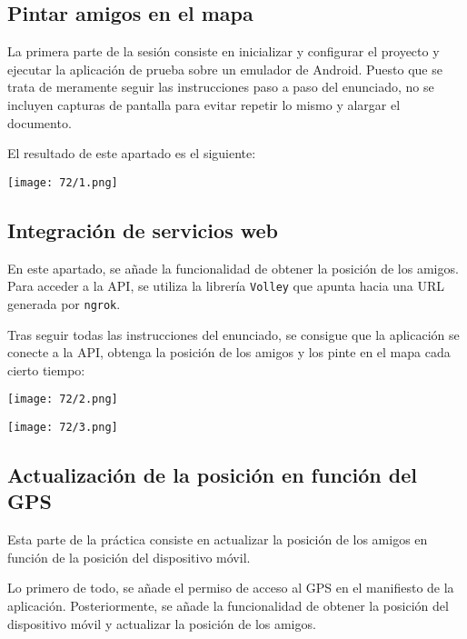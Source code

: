 \subsection{Pintar amigos en el mapa}
La primera parte de la sesión consiste en inicializar y configurar el proyecto y
ejecutar la aplicación de prueba sobre un emulador de Android. Puesto que se trata
de meramente seguir las instrucciones paso a paso del enunciado, no se incluyen
capturas de pantalla para evitar repetir lo mismo y alargar el documento.

El resultado de este apartado es el siguiente:

\begin{minipage}{\linewidth}
	\centering
	\texttt{[image: 72/1.png]}
	\label{fig:7/3}
\end{minipage}

\subsection{Integración de servicios web}
En este apartado, se añade la funcionalidad de obtener la posición de los amigos. Para acceder
a la API, se utiliza la librería \Verb#Volley# que apunta hacia una URL generada por \Verb#ngrok#.

Tras seguir todas las instrucciones del enunciado, se consigue que la aplicación se conecte a la API,
obtenga la posición de los amigos y los pinte en el mapa cada cierto tiempo:

\begin{minipage}{\linewidth}
	\centering
	\texttt{[image: 72/2.png]}
	\label{fig:7/4}
\end{minipage}

\begin{minipage}{\linewidth}
	\centering
	\texttt{[image: 72/3.png]}
	\label{fig:7/5}
\end{minipage}

\subsection{Actualización de la posición en función del GPS}
Esta parte de la práctica consiste en actualizar la posición de los amigos en función de la
posición del dispositivo móvil.

Lo primero de todo, se añade el permiso de acceso al GPS en el manifiesto de la aplicación.
Posteriormente, se añade la funcionalidad de obtener la posición del dispositivo móvil y
actualizar la posición de los amigos.

